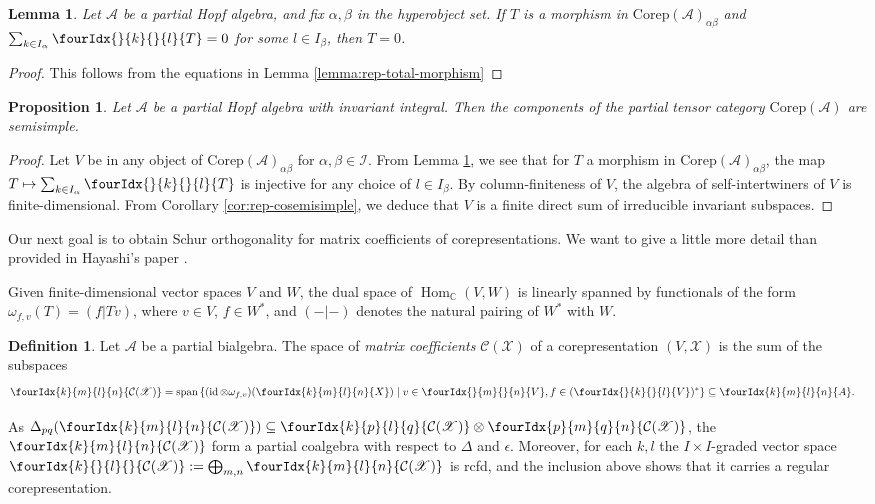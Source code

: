 \documentclass[10pt]{article}
\DeclareMathOperator{\id}{id}
\DeclareMathOperator{\Hom}{Hom}
\DeclareMathOperator{\Span}{\mathrm{span}}
\newcommand{\dual}[1]{#1^{*}}
\newcommand{\Corep}{\mathrm{Corep}}
\newcommand{\C}{\mathbb{C}}
\newcommand{\Gr}[5]{\fourIdx{#2}{#4}{#3}{#5}{#1}}%
\newcommand{\Gru}[3]{\Gr{#1}{}{}{#2}{#3}}
\newcommand{\Grd}[3]{\Gr{#1}{#2}{#3}{}{}}
\newtheorem{Lem}[Theorem]{Lemma}
\newtheorem{Prop}[Theorem]{Proposition}
\theoremstyle{definition}
\newtheorem{Def}[Theorem]{Definition}
\numberwithin{equation}{section}
\begin{document}
\begin{Lem}\label{LemInjMor}  Let $\mathscr{A}$ be a partial Hopf algebra, and fix $\alpha,\beta$ in the hyperobject set.  If $T$ is a morphism in $\Corep(\mathscr{A})_{\alpha\beta}$ and $\sum_{k\in I_\alpha} \Gru{T}{k}{l}=0$ for some $l \in I_\beta$, then $T=0$.
\end{Lem} 

\begin{proof} This follows from the equations in Lemma \ref{lemma:rep-total-morphism}
\end{proof}

\begin{Prop}\label{prop:rep-cosemisimple} Let $\mathscr{A}$ be a partial Hopf algebra with invariant integral.   Then the components of the partial tensor category $\Corep(\mathscr{A})$ are semisimple.
\end{Prop}
\begin{proof} 

Let $V$ be in any object of $\Corep(\mathscr{A})_{\alpha\beta}$ for $\alpha,\beta\in \mathscr{I}$.  From Lemma \ref{LemInjMor}, we see that for $T$ a morphism in $\Corep(\mathscr{A})_{\alpha\beta}$, the map $T\mapsto \sum_{k\in I_\alpha} \Gru{T}{k}{l}$ is injective for any choice of $l\in I_\beta$. By column-finiteness of $V$, the algebra of self-intertwiners of $V$ is finite-dimensional. From Corollary \ref{cor:rep-cosemisimple}, we deduce that $V$ is a finite direct sum of irreducible invariant subspaces.
\end{proof} 


Our next goal is to obtain Schur orthogonality for matrix coefficients of corepresentations. We want to give a little more detail than provided in Hayashi's paper \cite{Hay1}.

Given finite-dimensional vector spaces $V$ and $W$, the dual space of
$\Hom_{\C}(V,W)$ is linearly spanned by functionals of the form $\omega_{f,v}(T) =  (f|Tv)$, where $v\in V$, $f\in \dual{W}$, and $(-|-)$ denotes the natural
pairing of $\dual{W}$ with $W$.
\begin{Def} Let $\mathscr{A}$ be a partial bialgebra. The space of
  \emph{matrix coefficients} $\mathcal{C}(\mathscr{X})$ of a
  corepresentation $(V,\mathscr{X})$ is the sum of the subspaces
\begin{align*}
  \Gr{\mathcal{C}(\mathscr{X})}{k}{l}{m}{n} &= \Span \left\{ (\id \otimes
    \omega_{f,v})(\Gr{X}{k}{l}{m}{n}) \mid v\in \Gru{V}{m}{n}, f \in
    \dual{(\Gru{V}{k}{l})} \right\} \subseteq \Gr{A}{k}{l}{m}{n}.
\end{align*}
\end{Def}
As $\Delta_{pq}(\Gr{\mathcal{C}(\mathscr{X})}{k}{l}{m}{n}) \subseteq
  \Gr{\mathcal{C}(\mathscr{X})}{k}{l}{p}{q} \otimes
  \Gr{\mathcal{C}(\mathscr{X})}{p}{q}{m}{n}$, the $\Gr{\mathcal{C}(\mathscr{X})}{k}{l}{m}{n}$ form a partial
coalgebra with respect to $\Delta$ and $\epsilon$.  Moreover, for each
$k,l$ the $I\times I$-graded vector  space $\Grd{\mathcal{C}(\mathscr{X})}{k}{l}:=\bigoplus_{m,n }
  \Gr{\mathcal{C}(\mathscr{X})}{k}{l}{m}{n}$ is rcfd, and the inclusion above shows that it carries a regular corepresentation.
\end{document}
